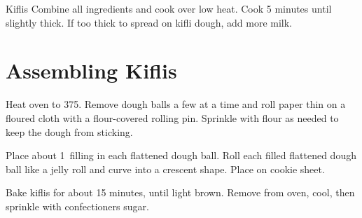 \begin{recipe}{Kiflis}
  Combine all ingredients and cook over low heat. Cook 5 minutes until
  slightly thick. If too thick to spread on kifli dough, add more milk.

  \section{Assembling Kiflis}
  Heat oven to 375\degF. Remove dough balls a few at a time and roll paper
  thin on a floured cloth with a flour-covered rolling pin. Sprinkle with
  flour as needed to keep the dough from sticking.

  Place about 1~\T filling in each flattened dough ball. Roll each filled
  flattened dough ball like a jelly roll and curve into a crescent shape.
  Place on cookie sheet.

  Bake kiflis for about 15 minutes, until light brown. Remove from oven,
  cool, then sprinkle with confectioners sugar.
\end{recipe}

